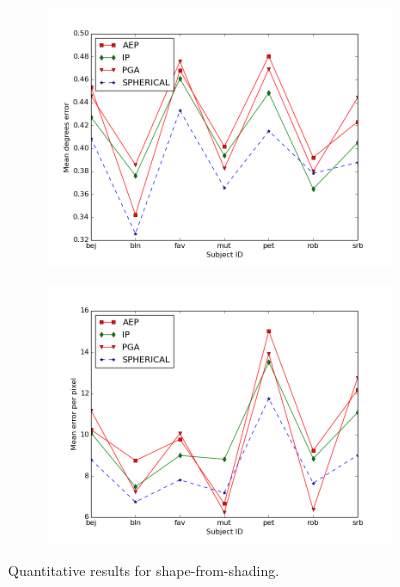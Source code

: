 \begin{figure}[t]
    \centering
    \begin{subfigure}{0.44\textwidth}
        \centering
        \includegraphics[width=\textwidth]{statistical_normals/images/gsfs_results/sfs-angle}
\label{fig:sfs-angle}
    \end{subfigure}
    \;
    \begin{subfigure}{0.44\textwidth}
        \centering
        \includegraphics[width=\textwidth]{statistical_normals/images/gsfs_results/sfs-height}
\label{fig:sfs-height}
    \end{subfigure}
    \caption{Quantitative results for shape-from-shading.}
\label{fig:sfs-results-quant}
\end{figure}
